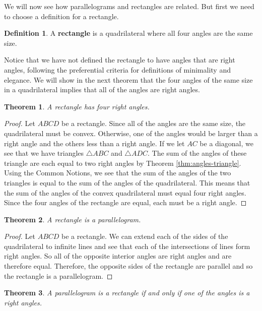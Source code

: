 \documentclass[
]{book}
\newtheorem{theorem}{Theorem}[chapter]
\theoremstyle{definition}
\newtheorem{definition}{Definition}[chapter]
\theoremstyle{definition}
\theoremstyle{definition}
\theoremstyle{definition}
\theoremstyle{remark}
\begin{document}
We will now see how parallelograms and rectangles are related. But first we need to choose a definition for a rectangle.

\begin{definition}
A \textbf{rectangle} is a quadrilateral where all four angles are the same size.
\end{definition}

Notice that we have not defined the rectangle to have angles that are right angles, following the preferential criteria for definitions of minimality and elegance. We will show in the next theorem that the four angles of the same size in a quadrilateral implies that all of the angles are right angles.

\begin{theorem}
A rectangle has four right angles.
\end{theorem}

\begin{proof}
Let \(ABCD\) be a rectangle. Since all of the angles are the same size, the quadrilateral must be convex. Otherwise, one of the angles would be larger than a right angle and the others less than a right angle. If we let \(AC\) be a diagonal, we see that we have triangles \(\triangle ABC\) and \(\triangle ADC\). The sum of the angles of these triangle are each equal to two right angles by Theorem \ref{thm:angles-triangle}. Using the Common Notions, we see that the sum of the angles of the two triangles is equal to the sum of the angles of the quadrilateral. This means that the sum of the angles of the convex quadrilateral must equal four right angles. Since the four angles of the rectangle are equal, each must be a right angle.
\end{proof}

\begin{theorem}
A rectangle is a parallelogram.
\end{theorem}

\begin{proof}
Let \(ABCD\) be a rectangle. We can extend each of the sides of the quadrilateral to infinite lines and see that each of the intersections of lines form right angles. So all of the opposite interior angles are right angles and are therefore equal. Therefore, the opposite sides of the rectangle are parallel and so the rectangle is a parallelogram.
\end{proof}

\begin{theorem}
\protect\hypertarget{thm:rectangle-angle}{}\label{thm:rectangle-angle}A parallelogram is a rectangle if and only if one of the angles is a right angles.
\end{theorem}
\end{document}
